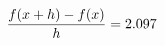 \documentclass[preview]{standalone}
\begin{document}
\begin{align*}
\special{dvisvgm:raw <g id='unique000'>}\frac{f(x+h)-f(x)}{h} = 2.097\special{dvisvgm:raw </g>}
\end{align*}
\end{document}
